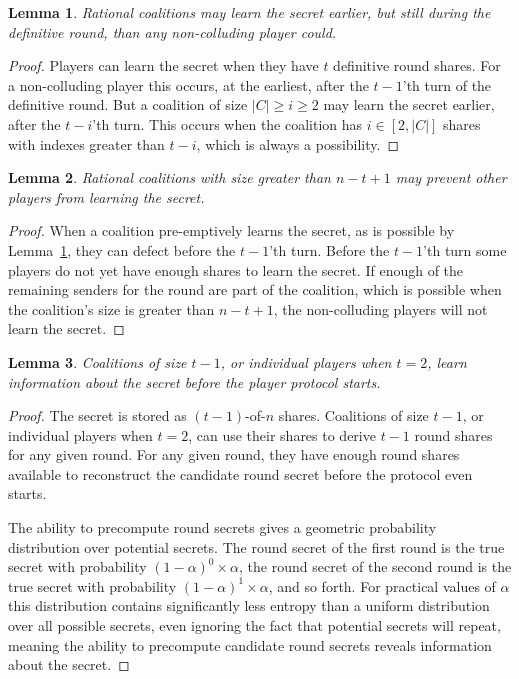 \documentclass[12pt]{dalcsthesis}
\newtheorem{lemma}{Lemma}
\begin{document}
\begin{lemma}\label{Lem:ABIP:Preempt}Rational coalitions may learn the secret earlier, but still during the definitive round, than any non-colluding player could.\end{lemma}
\begin{proof}
Players can learn the secret when they have $t$ definitive round shares. For a non-colluding player this occurs, at the earliest, after the $t-1$'th turn of the definitive round. But a coalition of size $|C| \geq i \geq 2$ may learn the secret earlier, after the $t-i$'th turn. This occurs when the coalition has $i \in [2, |C|]$ shares with indexes greater than $t-i$, which is always a possibility.
\end{proof}

\begin{lemma}\label{Lem:ABIP:RatColsCanPrevents}Rational coalitions with size greater than $n-t+1$ may prevent other players from learning the secret.\end{lemma}
\begin{proof}
When a coalition pre-emptively learns the secret, as is possible by Lemma~\ref{Lem:ABIP:Preempt}, they can defect before the $t-1$'th turn. Before the $t-1$'th turn some players do not yet have enough shares to learn the secret. If enough of the remaining senders for the round are part of the coalition, which is possible when the coalition's size is greater than $n-t+1$, the non-colluding players will not learn the secret.
\end{proof}

\begin{lemma}Coalitions of size $t-1$, or individual players when $t=2$, learn information about the secret before the player protocol starts.\end{lemma}
\begin{proof}
The secret is stored as $(t-1)$-of-$n$ shares. Coalitions of size $t-1$, or individual players when $t=2$, can use their shares to derive $t-1$ round shares for any given round. For any given round, they have enough round shares available to reconstruct the candidate round secret before the protocol even starts.

The ability to precompute round secrets gives a geometric probability distribution over potential secrets. The round secret of the first round is the true secret with probability $(1-\alpha)^0 \times \alpha$, the round secret of the second round is the true secret with probability $(1-\alpha)^1 \times \alpha$, and so forth. For practical values of $\alpha$ this distribution contains significantly less entropy than a uniform distribution over all possible secrets, even ignoring the fact that potential secrets will repeat, meaning the ability to precompute candidate round secrets reveals information about the secret.
\end{proof}
\end{document}
